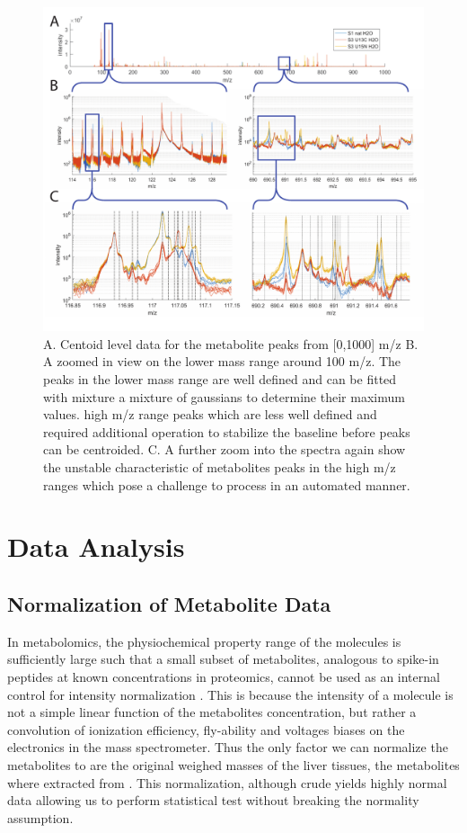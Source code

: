 \documentclass[a4paper]{book}
\begin{document}
	\begin{figure}[htb!]
		\centering
		\includegraphics[width=\linewidth]{3.Metabolomics/Raw_Signal.pdf}
		\caption{A. Centoid level data for the metabolite peaks from [0,1000] m/z\newline	
			B. A zoomed in view on the lower mass range around 100 m/z. The peaks in the lower mass range are well defined and can be fitted with mixture a mixture of gaussians to determine their maximum values. high m/z range peaks which are less well defined and required additional operation to stabilize the baseline before peaks can be centroided.
			C. A further zoom into the spectra again show the unstable characteristic of metabolites peaks in the high m/z ranges which pose a challenge to process in an automated manner. }
		\label{Raw Metabolite Profiles}
	\end{figure}
	
	\section{Data Analysis}
	
	\subsection{Normalization of Metabolite Data} 
	
	In metabolomics, the physiochemical property range of the molecules is sufficiently large such that a small subset of metabolites, analogous to spike-in peptides at known concentrations in proteomics, cannot be used as an internal control for intensity normalization \citep{Valikangas2016}. This is because the intensity of a molecule is not a simple linear function of the metabolites concentration, but rather a convolution of ionization efficiency, fly-ability and voltages biases on the electronics in the mass spectrometer. Thus the only factor we can normalize the metabolites to are the original weighed masses of the liver tissues, the metabolites where extracted from \citep{Valikangas2016}. This normalization, although crude yields highly normal data allowing us to perform statistical test without breaking the normality assumption.
	
\end{document}

